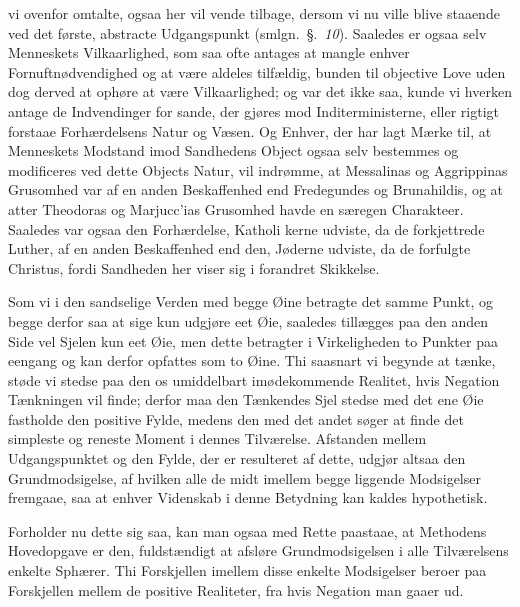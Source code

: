 \documentclass[12pt]{book}
\newcommand{\opage}[1]{\marginnote{\footnotesize\textit{[#1]}}}
\begin{document}
vi ovenfor omtalte, ogsaa her vil vende tilbage, dersom vi nu ville blive
staaende ved det første, abstracte Udgangspunkt (smlgn.\ §.~\textit{10}).
Saaledes er ogsaa selv Menneskets Vilkaarlighed, som saa ofte antages at mangle
enhver Fornuftnødvendighed og at være aldeles tilfældig, bunden til objective
Love uden dog derved at ophøre at være Vilkaarlighed; og var det ikke saa,
kunde vi hverken antage de Indvendinger for sande, der gjøres mod
Inditerministerne, eller rigtigt forstaae Forhærdelsens Natur og Væsen. Og
Enhver, der har lagt Mærke til, at Menneskets Modstand imod Sandhedens Object
ogsaa selv bestemmes og modificeres ved dette Objects Natur, vil indrømme, at
Messalinas og Aggrippinas Grusomhed var af en anden Beskaffenhed end
Fredegundes og Brunahildis, og at atter Theodoras og Marjucc'ias Grusomhed
havde en særegen Charakteer. Saaledes var ogsaa den Forhærdelse, Katholi\-%
\opage{40}kerne udviste, da de forkjettrede Luther, af en anden Beskaffenhed end den,
Jøderne udviste, da de forfulgte Christus, fordi Sandheden her viser sig i
forandret Skikkelse.

Som vi i den sandselige Verden med begge Øine betragte det samme Punkt, og
begge derfor saa at sige kun udgjøre eet Øie, saaledes tillægges paa den anden
Side vel Sjelen kun eet Øie, men dette betragter i Virkeligheden to Punkter
paa eengang og kan derfor opfattes som to Øine. Thi saasnart vi begynde at
tænke, støde vi stedse paa den os umiddelbart imødekommende Realitet, hvis
Negation Tænkningen vil finde; derfor maa den Tænkendes Sjel stedse med det ene
Øie fastholde den positive Fylde, medens den med det andet søger at finde det
simpleste og reneste Moment i dennes Tilværelse. Afstanden mellem
Udgangspunktet og den Fylde, der er resulteret af dette, udgjør altsaa den
Grundmodsigelse, af hvilken alle de midt imellem begge liggende Modsigelser
fremgaae, saa at enhver Videnskab i denne Betydning kan kaldes hypothetisk.

Forholder nu dette sig saa, kan man ogsaa med Rette paastaae, at Methodens
Hovedopgave er den, fuldstændigt at afsløre Grundmodsigelsen i alle
Tilværelsens enkelte Sphærer. Thi Forskjellen imellem disse enkelte
Modsigelser beroer paa Forskjellen mellem de positive Realiteter, fra hvis
Negation man gaaer ud.
\end{document}

